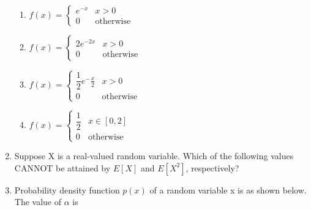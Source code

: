 \documentclass[journal,12pt,twocolumn]{IEEEtran}
\begin{document}
\begin{enumerate}
\begin{enumerate}
\item $
f(x)=
\begin{cases}
e^{-x} &  x>0\\
0 & \text{otherwise}
\end{cases}
$

\item $
f(x)=
\begin{cases}
2e^{-2x} &  x>0 \\
0 & \text{otherwise}
\end{cases}
$

\item $
f(x)=
\begin{cases}
\dfrac{1}{2}e^-{\frac{x}{2}} &  x>0 \\
0 & \text{otherwise}
\end{cases}
$

\item $
f(x)=
\begin{cases}
\dfrac{1}{2} &  x \in [0,2] \\
0 & \text{otherwise}
\end{cases}
$

\end{enumerate}
\solution



\item Suppose X is a real-valued random variable. Which of the following values CANNOT be attained by $E[X]$ and $E[X^2]$, respectively?

\begin{enumerate}
\end{enumerate}
\solution


\item Probability density function $p(x)$ of a random variable x is as shown below. The value of $\alpha$ is 


\end{enumerate}
\end{document}
